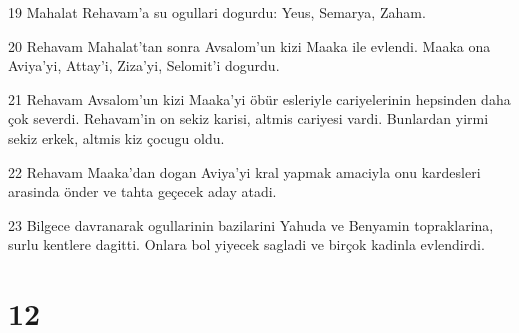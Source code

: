 \par 19 Mahalat Rehavam'a su ogullari dogurdu: Yeus, Semarya, Zaham.
\par 20 Rehavam Mahalat'tan sonra Avsalom'un kizi Maaka ile evlendi. Maaka ona Aviya'yi, Attay'i, Ziza'yi, Selomit'i dogurdu.
\par 21 Rehavam Avsalom'un kizi Maaka'yi öbür esleriyle cariyelerinin hepsinden daha çok severdi. Rehavam'in on sekiz karisi, altmis cariyesi vardi. Bunlardan yirmi sekiz erkek, altmis kiz çocugu oldu.
\par 22 Rehavam Maaka'dan dogan Aviya'yi kral yapmak amaciyla onu kardesleri arasinda önder ve tahta geçecek aday atadi.
\par 23 Bilgece davranarak ogullarinin bazilarini Yahuda ve Benyamin topraklarina, surlu kentlere dagitti. Onlara bol yiyecek sagladi ve birçok kadinla evlendirdi.

\chapter{12}

